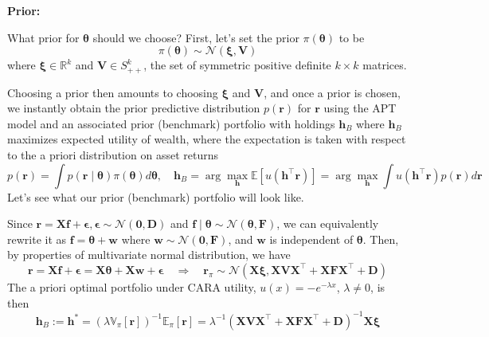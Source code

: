\documentclass[11pt]{article}
\theoremstyle{plain} %
\newenvironment{topic}
  {\color{C2}\normalfont\begin{framed}\begingroup}
    {\endgroup\end{framed}}
\theoremstyle{remark}
\newcommand{\EE}{\mathbb{E}}
\begin{document}
\begin{topic}
  \textbf{Prior:}

  What prior for $\boldsymbol{\theta}$ should we choose?
  First, let's set the prior $\pi(\boldsymbol{\theta})$ to be
  $$
    \pi(\boldsymbol{\theta}) \sim \mathcal{N}(\boldsymbol{\xi}, \boldsymbol{V})
  $$
  where $\boldsymbol{\xi} \in \mathbb{R}^k$ and $\boldsymbol{V} \in S_{++}^k$, the
  set of symmetric positive definite $k \times k$ matrices.

  Choosing a prior then amounts to choosing $\boldsymbol{\xi}$ and $\boldsymbol{V}$, and once
  a prior is chosen, we instantly obtain the prior predictive distribution $p(\boldsymbol{r})$ for $\boldsymbol{r}$ using the APT model and
  an associated prior (benchmark) portfolio with holdings $\boldsymbol{h}_B$
  where $\boldsymbol{h}_B$ maximizes expected utility of wealth, where the expectation
  is taken with respect to the a priori distribution on asset returns
  $$
    p(\boldsymbol{r})=\int p(\boldsymbol{r} \mid \boldsymbol{\theta}) \pi(\boldsymbol{\theta}) d \boldsymbol{\theta},
    \quad \boldsymbol{h}_B = \arg \max_{\boldsymbol{h}} \EE\left[u\left(\boldsymbol{h}^\top\boldsymbol{r}\right)\right]
    = \arg \max_{\boldsymbol{h}} \int u\left(\boldsymbol{h}^\top \boldsymbol{r}\right) p(\boldsymbol{r}) d \boldsymbol{r}
  $$
  Let's see what our prior (benchmark) portfolio will look like.

  Since $\boldsymbol{r}=\boldsymbol{X} \boldsymbol{f}+\boldsymbol{\epsilon},
    \boldsymbol{\epsilon}\sim \mathcal{N}\left(\boldsymbol{0}, \boldsymbol{D}\right)$ and $\boldsymbol{f}\mid\boldsymbol{\theta} \sim \mathcal{N}\left(\boldsymbol{\theta}, \boldsymbol{F}\right)$,
  we can equivalently rewrite it as $\boldsymbol{f} = \boldsymbol{\theta} + \boldsymbol{w}$
  where $\boldsymbol{w} \sim \mathcal{N}\left(\boldsymbol{0}, \boldsymbol{F}\right)$, and $\boldsymbol{w}$ is independent of $\boldsymbol{\theta}$.
  Then, by properties of multivariate normal distribution, we have
  $$
    \boldsymbol{r}=\boldsymbol{X} \boldsymbol{f}+\boldsymbol{\epsilon} =
    \boldsymbol{X} \boldsymbol{\theta}+\boldsymbol{X} \boldsymbol{w}+\boldsymbol{\epsilon}\quad
    \Longrightarrow \quad \boldsymbol{r}_{\pi} \sim \mathcal{N}\left(\boldsymbol{X}\boldsymbol{\xi}, \boldsymbol{X}\boldsymbol{V}\boldsymbol{X}^\top + \boldsymbol{X}\boldsymbol{F}\boldsymbol{X}^\top + \boldsymbol{D}\right)
  $$
  The a priori optimal portfolio under CARA utility, $u(x) = -e^{-\lambda x}$, $\lambda \ne 0$, is then
  $$
    \boldsymbol{h}_B:=\boldsymbol{h}^*
    =\left(\lambda \mathbb{V}_\pi[\boldsymbol{r}]\right)^{-1} \mathbb{E}_\pi[\boldsymbol{r}]
    =\lambda^{-1} \left(\boldsymbol{X}\boldsymbol{V}\boldsymbol{X}^\top + \boldsymbol{X}\boldsymbol{F}\boldsymbol{X}^\top + \boldsymbol{D}\right)^{-1} \boldsymbol{X}\boldsymbol{\xi}
  $$


\end{topic}
\end{document}
